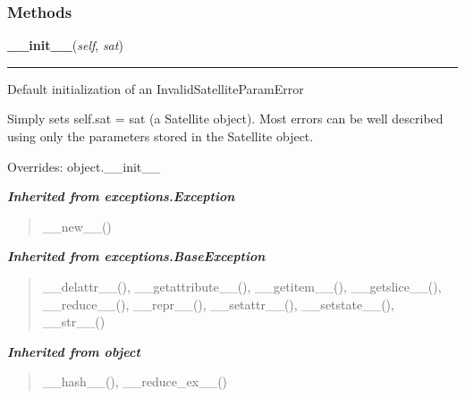 
  \subsubsection{Methods}

    \vspace{0.5ex}

\hspace{.8\funcindent}\begin{boxedminipage}{\funcwidth}

    \raggedright \textbf{\_\_init\_\_}(\textit{self}, \textit{sat})

    \vspace{-1.5ex}

    \rule{\textwidth}{0.5\fboxrule}
\setlength{\parskip}{2ex}
    Default initialization of an InvalidSatelliteParamError

    Simply sets self.sat = sat (a Satellite object).  Most errors can be 
    well described using only the parameters stored in the Satellite 
    object.

\setlength{\parskip}{1ex}
      Overrides: object.\_\_init\_\_

    \end{boxedminipage}


\large{\textbf{\textit{Inherited from exceptions.Exception}}}

\begin{quote}
\_\_new\_\_()
\end{quote}

\large{\textbf{\textit{Inherited from exceptions.BaseException}}}

\begin{quote}
\_\_delattr\_\_(), \_\_getattribute\_\_(), \_\_getitem\_\_(), \_\_getslice\_\_(), \_\_reduce\_\_(), \_\_repr\_\_(), \_\_setattr\_\_(), \_\_setstate\_\_(), \_\_str\_\_()
\end{quote}

\large{\textbf{\textit{Inherited from object}}}

\begin{quote}
\_\_hash\_\_(), \_\_reduce\_ex\_\_()
\end{quote}


